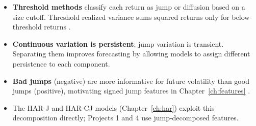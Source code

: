 \begin{itemize}[nosep]
  \item \textbf{Threshold methods} classify each return as jump or diffusion based on a size cutoff.  Threshold realized variance sums squared returns only for below-threshold returns \citep{Mancini2009, CorsiPirinoReno2010}.

  \item \textbf{Continuous variation is persistent}; jump variation is transient.  Separating them improves forecasting by allowing models to assign different persistence to each component.

  \item \textbf{Bad jumps} (negative) are more informative for future volatility than good jumps (positive), motivating signed jump features in Chapter~\ref{ch:features} \citep{BKT2015, PSS2015}.

  \item The HAR-J and HAR-CJ models (Chapter~\ref{ch:har}) exploit this decomposition directly; Projects 1 and 4 use jump-decomposed features.
\end{itemize}



